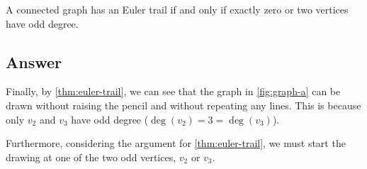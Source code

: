 \begin{proposition} \label{thm:euler-trail}
    A connected graph has an Euler trail if and only if exactly zero or two vertices have odd degree.
\end{proposition}

\subsection{Answer}

    Finally, by \cref{thm:euler-trail}, we can see that the graph in \cref{fig:graph-a} can be drawn without raising the pencil and without repeating any lines. This is because only $v_2$ and $v_3$ have odd degree ($\deg(v_2) = 3 = \deg(v_3)$).

    Furthermore, considering the argument for \cref{thm:euler-trail}, we must start the drawing at one of the two odd vertices, $v_2$ or $v_3$.
